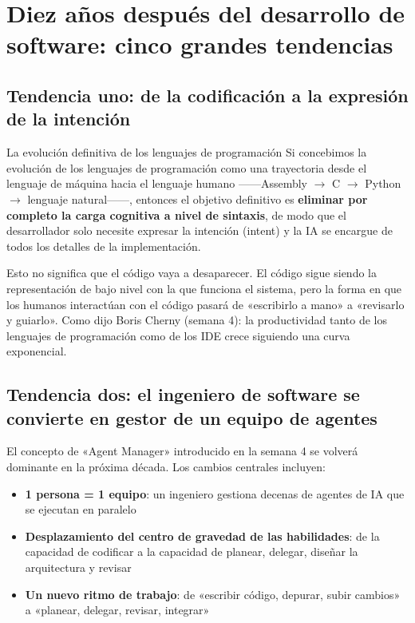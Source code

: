 \section{Diez años después del desarrollo de software: cinco grandes tendencias}

\subsection{Tendencia uno: de la codificación a la expresión de la intención}

\begin{importantbox}{La evolución definitiva de los lenguajes de programación}
Si concebimos la evolución de los lenguajes de programación como una trayectoria desde el lenguaje de máquina hacia el lenguaje humano ——Assembly $\rightarrow$ C $\rightarrow$ Python $\rightarrow$ lenguaje natural——, entonces el objetivo definitivo es \textbf{eliminar por completo la carga cognitiva a nivel de sintaxis}, de modo que el desarrollador solo necesite expresar la intención (intent) y la IA se encargue de todos los detalles de la implementación.
\end{importantbox}

Esto no significa que el código vaya a desaparecer. El código sigue siendo la representación de bajo nivel con la que funciona el sistema, pero la forma en que los humanos interactúan con el código pasará de «escribirlo a mano» a «revisarlo y guiarlo». Como dijo Boris Cherny (semana 4): la productividad tanto de los lenguajes de programación como de los IDE crece siguiendo una curva exponencial.

\subsection{Tendencia dos: el ingeniero de software se convierte en gestor de un equipo de agentes}

El concepto de «Agent Manager» introducido en la semana 4 se volverá dominante en la próxima década. Los cambios centrales incluyen:

\begin{itemize}
    \item \textbf{1 persona = 1 equipo}: un ingeniero gestiona decenas de agentes de IA que se ejecutan en paralelo
    \item \textbf{Desplazamiento del centro de gravedad de las habilidades}: de la capacidad de codificar a la capacidad de planear, delegar, diseñar la arquitectura y revisar
    \item \textbf{Un nuevo ritmo de trabajo}: de «escribir código, depurar, subir cambios» a «planear, delegar, revisar, integrar»
\end{itemize}

